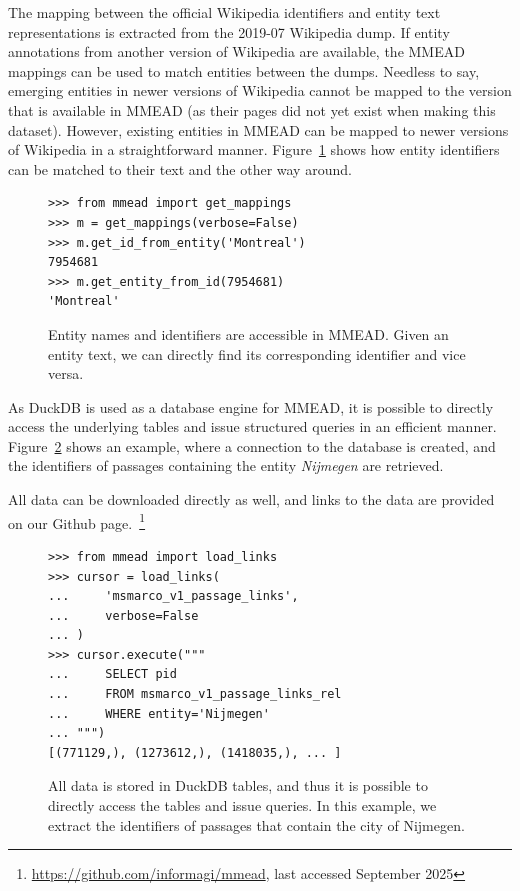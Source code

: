 The mapping between the official Wikipedia identifiers and entity text representations is extracted from the 2019-07 Wikipedia dump. If entity annotations from another version of Wikipedia are available, the MMEAD mappings can be used to match entities between the dumps. 
Needless to say, emerging entities in newer versions of Wikipedia cannot be mapped to the version that is available in MMEAD (as their pages did not yet exist when making this dataset). However, existing entities in MMEAD can be mapped to newer versions of Wikipedia in a straightforward manner.
Figure~\ref{fig:load_mappings} shows how entity identifiers can be matched to their text and the other way around.  

\begin{figure}
	\begin{verbatim}
>>> from mmead import get_mappings
>>> m = get_mappings(verbose=False)
>>> m.get_id_from_entity('Montreal')
7954681
>>> m.get_entity_from_id(7954681)
'Montreal'
	\end{verbatim}
	\caption{Entity names and identifiers are accessible in MMEAD. Given an entity text, we can directly find its corresponding identifier and vice versa.}
	\label{fig:load_mappings}
\end{figure}

As DuckDB is used as a database engine for MMEAD, it is possible to directly access the underlying tables and issue structured queries in an efficient manner. Figure~\ref{fig:sql_engine} shows an example, where a connection to the database is created, and the identifiers of passages containing the entity \emph{Nijmegen} are retrieved.

All data can be downloaded directly as well, and links to the data are provided on our Github page.~\footnote{\url{https://github.com/informagi/mmead}, last accessed September 2025}

\begin{figure}
	\begin{verbatim}
>>> from mmead import load_links
>>> cursor = load_links(
...     'msmarco_v1_passage_links',
...     verbose=False
... )
>>> cursor.execute("""
...     SELECT pid 
...     FROM msmarco_v1_passage_links_rel 
...     WHERE entity='Nijmegen'
... """)
[(771129,), (1273612,), (1418035,), ... ]
	\end{verbatim}
	\caption{All data is stored in DuckDB tables, and thus it is possible to directly access the tables and issue queries. In this example, we extract the identifiers of passages that contain the city of Nijmegen.}
	\label{fig:sql_engine}
\end{figure}

